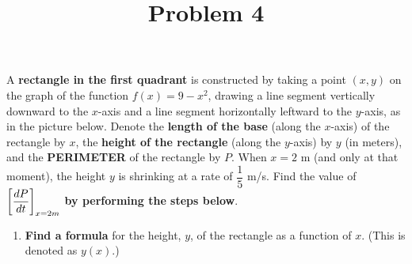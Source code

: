 \documentclass{ximera}
\title[Problem 4]{Problem 4}
\begin{document}
\begin{abstract} \end{abstract}
\maketitle


\begin{problem}
	A \textbf{rectangle in the first quadrant} is constructed by taking a point $(x,y)$ on the graph of the function $f(x)=9-x^2$, drawing a line segment vertically downward 
		to the $x$-axis and a line segment horizontally leftward to the $y$-axis, as in the picture below. 
		Denote the \textbf{length of the base} (along the $x$-axis) of the rectangle by $x$, the 
		\textbf{height of the rectangle} (along the $y$-axis) by $y$ (in meters), and the \textbf{PERIMETER} of the rectangle by $P$. 
		When $x = 2$ m (and only at that moment), the height $y$ is shrinking at a rate of $\dfrac{1}{5}$ m/s.  
		Find the value of $\displaystyle \bigg[ \dfrac{dP}{dt} \bigg]_{x=2 m}$ \textbf{by performing the steps below}.\\
		\begin{center}
		\end{center}
		


		\begin{enumerate}			
			\item\label{SpartA} \textbf{Find a formula} for the height, $y$, of the rectangle as a function of $x$. (This is denoted as $y(x)$.) \\


\end{enumerate}
\end{problem}
\end{document}
